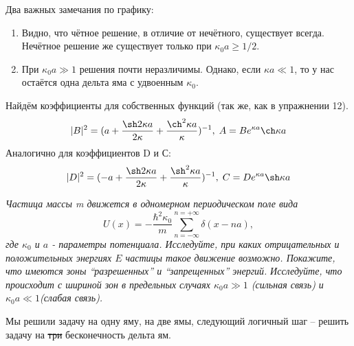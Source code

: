 Два важных замечания по графику:
\begin{enumerate}
    \item Видно, что чётное решение, в отличие от нечётного, существует всегда. Нечётное решение же существует только при $\kappa_0a \geq 1/2$.
    \item При $\kappa_0 a \gg 1$ решения почти неразличимы. Однако, если $\kappa a \ll 1$, то у нас остаётся одна дельта яма с удвоенным $\kappa_0$.
\end{enumerate}
Найдём коэффициенты для собственных функций (так же, как в упражнении 12).
\[
    |B|^2 =  (a + \frac{\sh 2 \kappa a}{2 \kappa} + \frac{\ch^2 \kappa a}{\kappa})^{-1}, \; A = B e^{\kappa a} \ch \kappa a \\
\]
Аналогично для коэффициентов D и С:
\[
    |D|^2 = (-a + \frac{\sh 2 \kappa a}{2 \kappa} + \frac{\sh^2 \kappa a}{\kappa})^{-1},\;C = De^{\kappa a}\sh \kappa a
\]

\begin{center}
    \textit{Частица массы m движется в одномерном периодическом поле вида}
    \[
    U(x) = -\frac{\hbar^2 \kappa_0}{m}\sum\limits_{n = - \infty}^{n = +\infty} \delta(x - n a),
    \]
    \textit{где $\kappa_0$ и $a$ - параметры потенциала. Исследуйте, при каких отрицательных и положительных энергиях $E$ частицы такое движение возможно. Покажите, что имеются зоны ``разрешенных'' и ``запрещенных'' энергий.}
    \textit{Исследуйте, что происходит с шириной зон в предельных случаях $\kappa_0 a \gg 1$ (сильная связь) и $\kappa_0 a \ll 1$(слабая связь).}
    
\end{center}

Мы решили задачу на одну яму, на две ямы, следующий логичный шаг -- решить задачу на \sout{три} бесконечность дельта ям.

